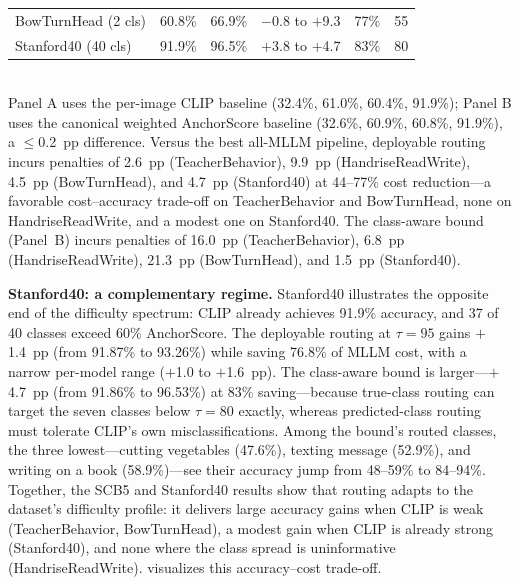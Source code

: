 \documentclass[11pt,a4paper]{article}
\begin{document}
\begin{table}[t]
\begin{tabular}{lccccc}
BowTurnHead (2 cls) & 60.8\% & 66.9\% & $-$0.8 to $+$9.3 & 77\% & 55 \\
Stanford40 (40 cls) & 91.9\% & 96.5\% & $+$3.8 to $+$4.7 & 83\% & 80 \\
\bottomrule
\end{tabular}
\\[2pt]
\footnotesize{Panel A uses the per-image CLIP baseline (32.4\%, 61.0\%, 60.4\%, 91.9\%); Panel B uses the canonical weighted AnchorScore baseline (32.6\%, 60.9\%, 60.8\%, 91.9\%), a $\leq$0.2~pp difference. Versus the best all-MLLM pipeline, deployable routing incurs penalties of 2.6~pp (TeacherBehavior), 9.9~pp (HandriseReadWrite), 4.5~pp (BowTurnHead), and 4.7~pp (Stanford40) at 44--77\% cost reduction---a favorable cost--accuracy trade-off on TeacherBehavior and BowTurnHead, none on HandriseReadWrite, and a modest one on Stanford40. The class-aware bound (Panel~B) incurs penalties of 16.0~pp (TeacherBehavior), 6.8~pp (HandriseReadWrite), 21.3~pp (BowTurnHead), and 1.5~pp (Stanford40).}
\end{table}

\noindent\textbf{Stanford40: a complementary regime.} Stanford40 illustrates the opposite end of the difficulty spectrum: CLIP already achieves 91.9\% accuracy, and 37 of 40 classes exceed 60\% AnchorScore. The deployable routing at $\tau=95$ gains $+$1.4~pp (from 91.87\% to 93.26\%) while saving 76.8\% of MLLM cost, with a narrow per-model range ($+$1.0 to $+$1.6~pp). The class-aware bound is larger---$+$4.7~pp (from 91.86\% to 96.53\%) at 83\% saving---because true-class routing can target the seven classes below $\tau=80$ exactly, whereas predicted-class routing must tolerate CLIP's own misclassifications. Among the bound's routed classes, the three lowest---cutting vegetables (47.6\%), texting message (52.9\%), and writing on a book (58.9\%)---see their accuracy jump from 48--59\% to 84--94\%. Together, the SCB5 and Stanford40 results show that routing adapts to the dataset's difficulty profile: it delivers large accuracy gains when CLIP is weak (TeacherBehavior, BowTurnHead), a modest gain when CLIP is already strong (Stanford40), and none where the class spread is uninformative (HandriseReadWrite).  visualizes this accuracy--cost trade-off.
\end{document}
